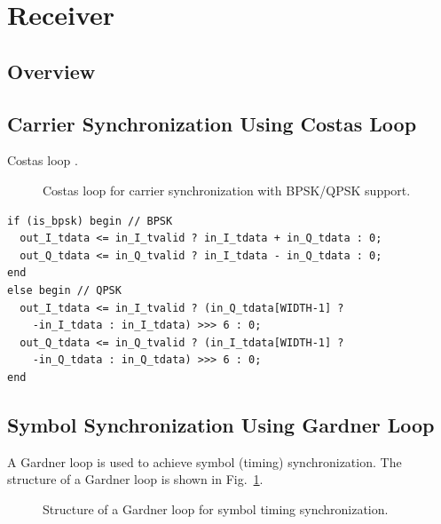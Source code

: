 \documentclass[journal,twoside]{IEEEtran}
\begin{document}
  \section{Receiver}

    \subsection{Overview}

    \subsection{Carrier Synchronization Using Costas Loop}

      Costas loop \cite{simon1977optimum}.

      \begin{figure}[htbp]
        \centering
        
        \caption{Costas loop for carrier synchronization with BPSK/QPSK support.}
      \end{figure}

      \begin{verbatim}
if (is_bpsk) begin // BPSK
  out_I_tdata <= in_I_tvalid ? in_I_tdata + in_Q_tdata : 0;
  out_Q_tdata <= in_Q_tvalid ? in_I_tdata - in_Q_tdata : 0;
end
else begin // QPSK
  out_I_tdata <= in_I_tvalid ? (in_Q_tdata[WIDTH-1] ?
    -in_I_tdata : in_I_tdata) >>> 6 : 0;
  out_Q_tdata <= in_Q_tvalid ? (in_I_tdata[WIDTH-1] ?
    -in_Q_tdata : in_Q_tdata) >>> 6 : 0;
end
      \end{verbatim}

    \subsection{Symbol Synchronization Using Gardner Loop}

      A Gardner loop \cite{gardner1986bpsk} is used to achieve symbol (timing) synchronization.
      The structure of a Gardner loop is shown in Fig.~\ref{fig:gardner_loop}.
      \begin{figure}[htbp]
        
        \caption{Structure of a Gardner loop for symbol timing synchronization.}
        \label{fig:gardner_loop}
      \end{figure}
\end{document}
